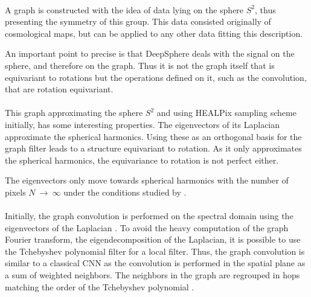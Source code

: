 \documentclass[11pt]{report}
\begin{document}
\paragraph*{}
A graph is constructed with the idea of data lying on the sphere $S^2$, thus presenting the symmetry of this group. This data consisted originally of cosmological maps, but can be applied to any other data fitting this description.

An important point to precise is that DeepSphere deals with the signal on the sphere, and therefore on the graph. Thus it is not the graph itself that is equivariant to rotations but the operations defined on it, such as the convolution, that are rotation equivariant.

\paragraph*{}
This graph approximating the sphere $S^2$ and using HEALPix \cite{gorski_healpix_2005} sampling scheme initially, has some interesting properties. The eigenvectors of its Laplacian approximate the spherical harmonics. Using these as an orthogonal basis for the graph filter leads to a structure equivariant to rotation. As it only approximates the spherical harmonics, the equivariance to rotation is not perfect either.

The eigenvectors only move towards spherical harmonics with the number of pixels $N~\rightarrow~\infty$ under the conditions studied by \cite{milani_about_nodate}.


\paragraph*{}
Initially, the graph convolution is performed on the spectral domain using the eigenvectors of the Laplacian \cite{bruna_spectral_2013}. To avoid the heavy computation of the graph Fourier transform, the eigendecomposition of the Laplacian, it is possible to use the Tchebyshev polynomial filter \cite{defferrard_convolutional_2016} for a local filter. Thus, the graph convolution is similar to a classical CNN as the convolution is performed in the spatial plane as a sum of weighted neighbors. The neighbors in the graph are regrouped in hops matching the order of the Tchebyshev polynomial \cite{defferrard_convolutional_2016}.
\end{document}
